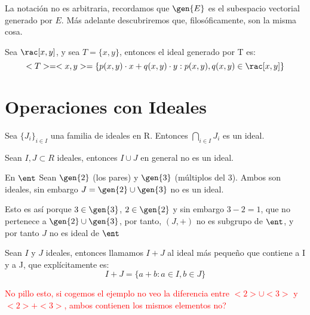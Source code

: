 La notación no es arbitraria, recordamos que $\gen{E}$ es el subespacio vectorial generado por $E$. Más adelante descubriremos que, filosóficamente, son la misma cosa.

\begin{example} Sea $\rac[x,y]$, y sea $T=\{x,y\}$, entonces el ideal generado por T es:
	$$<T> = <x,y>= \{p(x,y)\cdot x+q(x,y)\cdot y : p(x,y),q(x,y) \in \rac[x,y]\}$$
\end{example}

\section{Operaciones con Ideales}

\begin{prop}
	Sea $\{J_i\}_{i\in I}$ una familia de ideales en R. Entonces $\bigcap_{i \in I}J_i$ es un ideal.
\end{prop}


\begin{prop}
	Sean $I,J \subset R$ ideales, entonces $I \cup J$ en general no es un ideal.
\end{prop}

\begin{example} En $\ent$
	Sean $\gen{2}$ (los pares) y $\gen{3}$ (múltiplos del 3). Ambos son ideales, sin embargo $J=\gen{2} \cup \gen{3}$ no es un ideal.

	Esto es así porque $3\in \gen{3}$, $2 \in \gen{2}$ y sin embargo $3-2=1$, que no pertenece a $\gen{2} \cup \gen{3}$, por tanto, $(J,+)$ no es subgrupo de $\ent$, y por tanto $J$ no es ideal de $\ent$
\end{example}

\begin{defn}
Sean $I$ y $J$ ideales, entonces llamamos $I+J$ al ideal más pequeño que contiene a I y a J, que explícitamente es:
$$ I+J = \{a+b: a\in I, b\in J\} $$

\textcolor{red}{No pillo esto, si cogemos el ejemplo no veo la diferencia entre $<2> \cup <3>$ y $<2> + <3>$, ambos contienen los mismos elementos no?}


\end{defn}

